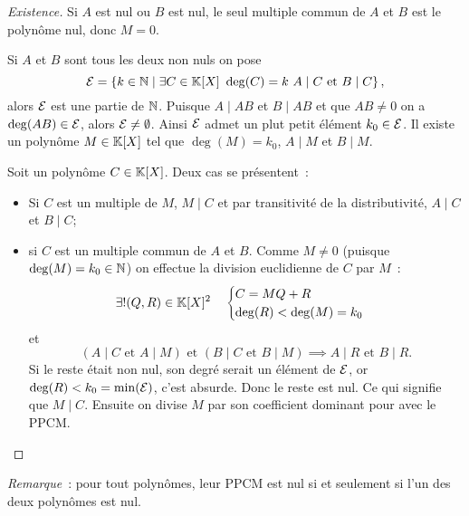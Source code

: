   \begin{proof}[Existence]
    Si \(A\) est nul ou \(B\) est nul, le seul multiple commun de \(A\) et \(B\) est le polynôme nul, donc \(M=0\).

    Si \(A\) et \(B\) sont tous les deux non nuls on pose
    \begin{equation}
      \E=\enstq{k \in \N}{\exists C \in \K[X] \ \deg(C)=k \ A\mid{}C \text{~et~} B\mid{}C},
    \end{equation}
    alors \(\mathcal{E}\) est une partie de \(\mathbb{N}\). Puisque \(A\mid{}AB\) et \(B\mid{}AB\) et que \(AB \neq 0\) on a \(\deg(AB) \in \mathcal{E}\), alors \(\mathcal{E}\neq \emptyset\). Ainsi \(\mathcal{E}\) admet un plut petit élément \(k_0 \in \mathcal{E}\). Il existe un polynôme \(M \in \mathbb{K}[X]\) tel que \(\deg(M)=k_0\), \(A\mid{}M\) et \(B\mid{}M\).

    Soit un polynôme \(C \in \mathbb{K}[X]\). Deux cas se présentent~:
    \begin{itemize}
      \item Si \(C\) est un multiple de \(M\), \(M\mid{}C\) et par transitivité de la distributivité, \(A\mid{}C\) et \(B\mid{}C\);
      \item si \(C\) est un multiple commun de \(A\) et \(B\). Comme \(M \neq 0\) (puisque \(\deg(M)=k_0 \in \mathbb{N}\)) on effectue la division euclidienne de \(C\) par \(M\)~:
        \begin{equation}
          \exists! (Q,R) \in \mathbb{K}[X]^2 \quad \begin{cases} C=MQ+R \\ \deg(R) < \deg(M)=k_0 \end{cases}
        \end{equation}
        et
        \begin{equation}
          (A\mid{}C \text{~et~} A\mid{}M) \text{~et~} (B\mid{}C \text{~et~} B\mid{}M) \implies A\mid{}R \text{~et~} B\mid{}R.
        \end{equation}
        Si le reste était non nul, son degré serait un élément de \(\mathcal{E}\), or \(\deg(R) < k_0 = \min(\mathcal{E})\), c'est absurde. Donc le reste est nul. Ce qui signifie que \(M\mid{}C\). Ensuite on divise \(M\) par son coefficient dominant pour avec le PPCM.
    \end{itemize}
  \end{proof}

  \emph{Remarque}~: pour tout polynômes, leur PPCM est nul si et seulement si l'un des deux polynômes est nul.

